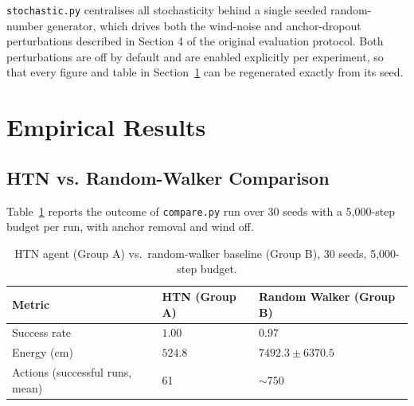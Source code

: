 \texttt{stochastic.py} centralises all stochasticity behind a single seeded random-number generator, which drives both the wind-noise and anchor-dropout perturbations described in Section 4 of the original evaluation protocol. Both perturbations are off by default and are enabled explicitly per experiment, so that every figure and table in Section~\ref{sec:orig-results} can be regenerated exactly from its seed.

\section{Empirical Results}
\label{sec:orig-results}

\subsection{HTN vs. Random-Walker Comparison}
\label{sec:orig-comparison}

Table~\ref{tab:orig-comparison} reports the outcome of \texttt{compare.py} run over 30 seeds with a 5,000-step budget per run, with anchor removal and wind off.

\begin{table}[H]
\centering
\caption{HTN agent (Group A) vs.\ random-walker baseline (Group B), 30 seeds, 5,000-step budget.}
\label{tab:orig-comparison}
\begin{tabular}{lll}
\toprule
\textbf{Metric} & \textbf{HTN (Group A)} & \textbf{Random Walker (Group B)} \\
\midrule
Success rate & $1.00$ & $0.97$ \\
Energy (cm) & $524.8$ & $7492.3 \pm 6370.5$ \\
Actions (successful runs, mean) & 61 & $\sim 750$ \\
\bottomrule
\end{tabular}
\end{table}


